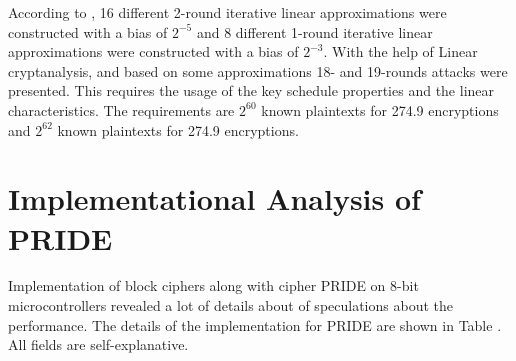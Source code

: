 \documentclass{transcrypto}
\begin{document}
	According to \cite{chinese}, 16 different 2-round iterative linear approximations were constructed with a bias of $2^{-5}$ and 8 different 1-round iterative linear approximations were constructed with a bias of $2^{-3}$. With the help of Linear cryptanalysis, and based on some approximations 18- and 19-rounds attacks were presented. This requires the usage of the key schedule properties and the linear characteristics. The requirements are $2^{60}$ known plaintexts for 274.9 encryptions and $2^{62}$ known plaintexts for 274.9 encryptions.
	\section{Implementational Analysis of PRIDE}
	Implementation of block ciphers along with cipher PRIDE on 8-bit microcontrollers \cite{Hatzivasilis2018} revealed a lot of details about of speculations about the performance. The details of the implementation for PRIDE are shown in Table . All fields are self-explanative.
	
\end{document}
